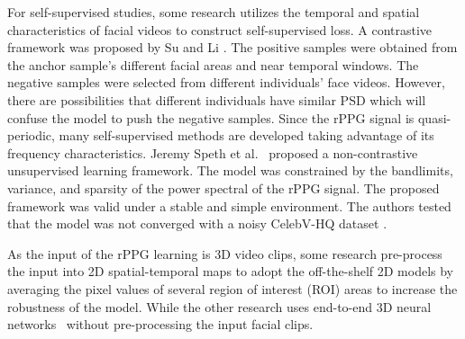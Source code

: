 For self-supervised studies, some research utilizes the temporal and spatial characteristics of facial videos to construct self-supervised loss.  A contrastive framework was proposed by Su and Li \cite{sun2022contrast}. The positive samples were obtained from the anchor sample's different facial areas and near temporal windows. The negative samples were selected from different individuals' face videos. However, there are possibilities that different individuals have similar PSD which will confuse the model to push the negative samples. Since the rPPG signal is quasi-periodic, many self-supervised methods are developed taking advantage of its frequency characteristics. Jeremy Speth et al.~\cite{speth2023non} proposed a non-contrastive unsupervised learning framework. The model was constrained by the bandlimits, variance, and sparsity of the power spectral of the rPPG signal. The proposed framework was valid under a stable and simple environment. The authors tested that the model was not converged with a noisy CelebV-HQ dataset \cite{zhu2022celebv}.

As the input of the rPPG learning is 3D video clips,  some research \cite{niu2019rhythmnet,niu2020video,das2021bvpnet} pre-process the input into 2D spatial-temporal maps to adopt the off-the-shelf 2D models by averaging the pixel values of several region of interest (ROI) areas to increase the robustness of the model.  While the other research uses end-to-end 3D neural networks~\cite{yu2019remote,yu2022physformer} without pre-processing the input facial clips. 


